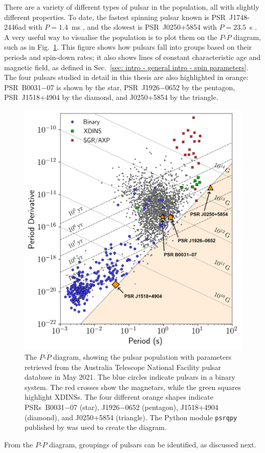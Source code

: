 There are a variety of different types of pulsar in the population, all with slightly different properties. To date, the fastest spinning pulsar known is PSR~J1748-2446ad with $P=1.4$~ms \citep{HRS+2006}, and the slowest is PSR~J0250+5854 with $P=23.5$~s \citep[][see Chapter~\ref{chapt: J0250}]{TBC+2018}. A very useful way to visualise the population is to plot them on the $P$-$\dot{P}$ diagram, such as in Fig.~\ref{fig: intro - ppdot diagram}. This figure shows how pulsars fall into groups based on their periods and spin-down rates; it also shows lines of constant characteristic age and magnetic field, as defined in Sec.~\ref{sec: intro - general intro - spin parameters}. The four pulsars studied in detail in this thesis are also highlighted in orange: PSR~B0031$-$07 is shown by the star, PSR~J1926$-$0652 by the pentagon, PSR~J1518+4904 by the diamond, and J0250+5854 by the triangle.
\begin{figure}
    \begin{center}
        \includegraphics[width=1.0\textwidth]{Figures/Introduction/ppdot_diagram_labelled}
        \caption[The period and period derivative diagram]{The $P$-$\dot{P}$ diagram, showing the pulsar population with parameters retrieved from the Australia Telescope National Facility pulsar database \citep{ATNFcatalogue} in May 2021. The blue circles indicate pulsars in a binary system. The red crosses show the magnetars, while the green squares highlight XDINSs. The four different orange shapes indicate PSRs~B0031$-$07 (star), J1926$-$0652 (pentagon), J1518+4904 (diamond), and J0250+5854 (triangle). The Python module \texttt{psrqpy} published by \citet{Pxxx2018} was used to create the diagram.}
        \label{fig: intro - ppdot diagram}
    \end{center}
\end{figure}
From the $P$-$\dot{P}$ diagram, groupings of pulsars can be identified, as discussed next.


